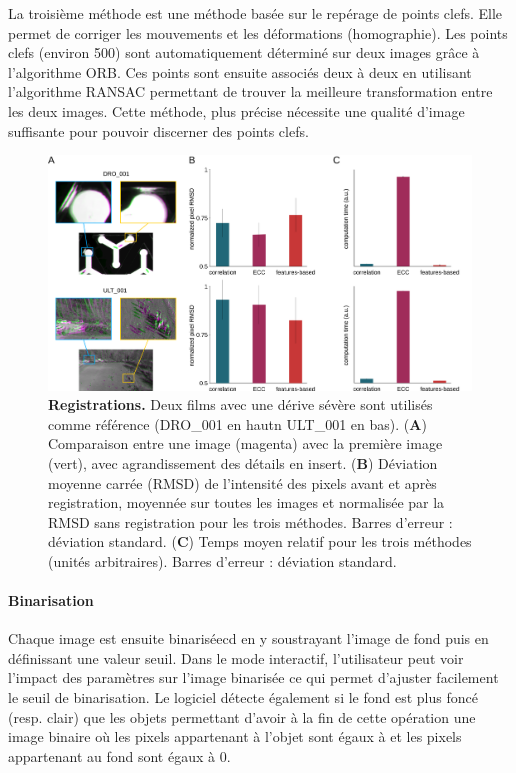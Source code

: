 		La troisième méthode est une méthode basée sur le repérage de points clefs. Elle permet de corriger les mouvements et les déformations (homographie). Les points clefs (environ 500) sont automatiquement déterminé sur deux images grâce à l'algorithme ORB. Ces points sont ensuite associés deux à deux en utilisant l’algorithme RANSAC permettant de trouver la meilleure transformation entre les deux images. Cette méthode, plus précise nécessite une qualité d'image suffisante pour pouvoir discerner des points clefs.
		
	\begin{figure}[h]
    \centering
    \includegraphics[width=1\textwidth]{part_1/assets/Figure_2.png}    
    \caption{\textbf{Registrations.} Deux films avec une dérive sévère sont utilisés comme référence (DRO\_001 en hautn ULT\_001 en bas). (\textbf{A}) Comparaison entre une image (magenta) avec la première image (vert), avec agrandissement des détails en insert. (\textbf{B}) Déviation moyenne carrée (RMSD) de l'intensité des pixels avant et après registration, moyennée sur toutes les images et normalisée par la RMSD sans registration pour les trois méthodes. Barres d'erreur : déviation standard. (\textbf{C}) Temps moyen relatif pour les trois méthodes (unités arbitraires). Barres d'erreur : déviation standard.}
    \label{part_1:fig_2}
    \end{figure}
		
		
		\paragraph{Binarisation}
		Chaque image est ensuite binariséecd  en y soustrayant l'image de fond puis en définissant une valeur seuil. Dans le mode interactif, l'utilisateur peut voir l'impact des paramètres sur l'image binarisée ce qui permet d'ajuster facilement le seuil de binarisation. Le logiciel détecte également si le fond est plus foncé (resp. clair) que les objets permettant d'avoir à la fin de cette opération une image binaire  où les pixels appartenant à l’objet sont égaux à  et les pixels appartenant au fond sont égaux à 0.
		
